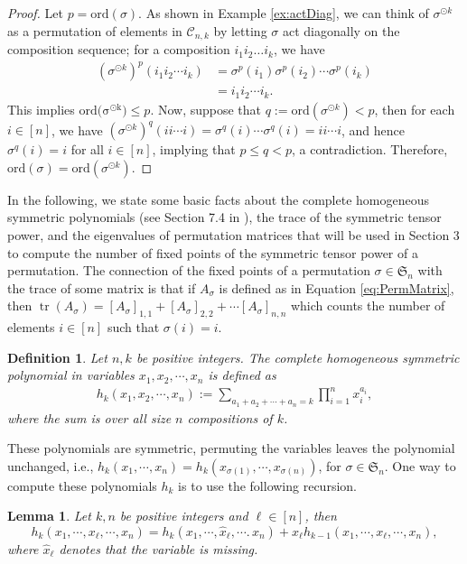 \documentclass[12pt]{amsart}
\newtheorem{definition}{Definition}[section]
\newtheorem{lemma}{Lemma}[section]
\newcommand{\tr}{\operatorname{tr}}
\begin{document}
\begin{proof}
    Let $p = \mathrm{ord}(\sigma)$. As shown in Example \ref{ex:actDiag}, we can think of $\sigma^{\odot k}$ as a permutation of elements in $\mathcal{C}_{n,k}$ by letting $\sigma$ act diagonally on the composition sequence; for a composition $i_1i_2\dots i_k$, we have
    \begin{align*}
        (\sigma^{\odot k})^p(i_1 i_2 \cdots i_k) &= \sigma^p(i_1) \sigma^p(i_2) \cdots \sigma^p(i_k)\\
        &= i_1i_2 \cdots i_k.
    \end{align*}
    This implies $\mathrm{ord(\sigma^{\odot k}}) \le p$. Now, suppose that $q:=\mathrm{ord}(\sigma^{\odot k}) < p$, then for each $i \in [n]$, we have $(\sigma^{\odot k})^{q}(i i \cdots i) = \sigma^q(i)\cdots \sigma^q(i) = ii \cdots i$, and hence $\sigma^q(i) = i$ for all $i \in [n]$, implying that $p \le q < p$, a contradiction. Therefore, $\mathrm{ord}(\sigma) = \mathrm{ord}(\sigma^{\odot k})$.
\end{proof}
In the following, we state some basic facts about the complete homogeneous symmetric polynomials (see Section 7.4 in \cite{Stanley_2023}), the trace of the symmetric tensor power, and the eigenvalues of permutation matrices that will be used in Section 3 to compute the number of fixed points of the symmetric tensor power of a permutation. The connection of the fixed points of a permutation $\sigma \in \mathfrak{S}_n$ with the trace of some matrix is that if  $A_{\sigma}$ is defined as in Equation \ref{eq:PermMatrix}, then $\tr (A_{\sigma}) = [A_\sigma]_{1,1}+[A_\sigma]_{2,2}+\cdots [A_\sigma]_{n,n}$ which counts the number of elements $i\in [n]$ such that $\sigma(i)=i$.
\begin{definition}
\label{def:HomPolynomial}
Let $n,k$ be positive integers. The \textit{complete homogeneous symmetric polynomial} in variables $x_1,x_2,\cdots ,x_n$ is defined as
\begin{align}
\label{eq:defHomSymPol}
    h_k(x_1,x_2,\cdots, x_n) := \sum _{a_1+a_2+\cdots +a_n = k}\prod _{i = 1}^nx_i^{a_i},
\end{align}
    where the sum is over all size $n$ compositions of $k$.
\end{definition}
These polynomials are symmetric, permuting the variables leaves the polynomial unchanged, i.e., $h_k(x_1,\cdots, x_n) = h_k(x_{\sigma (1)},\cdots , x_{\sigma(n)})$, for $\sigma \in \mathfrak{S}_n$. 
One way to compute these polynomials $h_k$ is to use the following recursion. 
\begin{lemma}
    \label{lemma:homoSymProp}
    Let $k,n$ be positive integers and $\ell \in [n]$, then
    $$h_k(x_1,\cdots,x_{\ell},\cdots  , x_n) = h_k(x_1,\cdots ,\hat{x}_{\ell},\cdots .\,x_n)+x_{\ell}h_{k-1}(x_1,\cdots , x_{\ell},\cdots ,x_n),$$
    where $\hat{x}_{\ell}$ denotes that the variable is missing.
\end{lemma}
\end{document}
